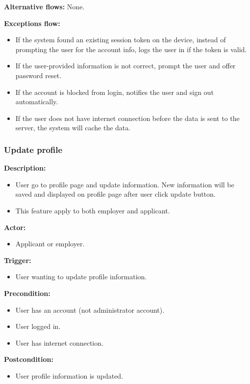 \documentclass[a4paper]{article}
\begin{document}
\textbf{Alternative flows:}
None.

\textbf{Exceptions flow:}
\begin{itemize}
    \item If the system found an existing session token on the device, instead of prompting the user for the account info, logs the user in if the token is valid.
    \item If the user-provided information is not correct, prompt the user and offer password reset.
    \item If the account is blocked from login, notifies the user and sign out automatically.
    \item If the user does not have internet connection before the data is sent to the server, the system will cache the data.
\end{itemize}

\subsubsection{Update profile}
\textbf{Description:}
\begin{itemize}
    \item User go to profile page and update information. New information will be saved and displayed on profile page after user click update button.
    \item This feature apply to both employer and applicant.
\end{itemize}

\textbf{Actor:}
\begin{itemize}
    \item Applicant or employer.
\end{itemize}

\textbf{Trigger:}
\begin{itemize}
    \item User wanting to update profile information.
\end{itemize}

\textbf{Precondition:}
\begin{itemize}
    \item User has an account (not administrator account).
    \item User logged in.
    \item User has internet connection.
\end{itemize}

\textbf{Postcondition:}
\begin{itemize}
    \item User profile information is updated.
\end{itemize}
\end{document}
